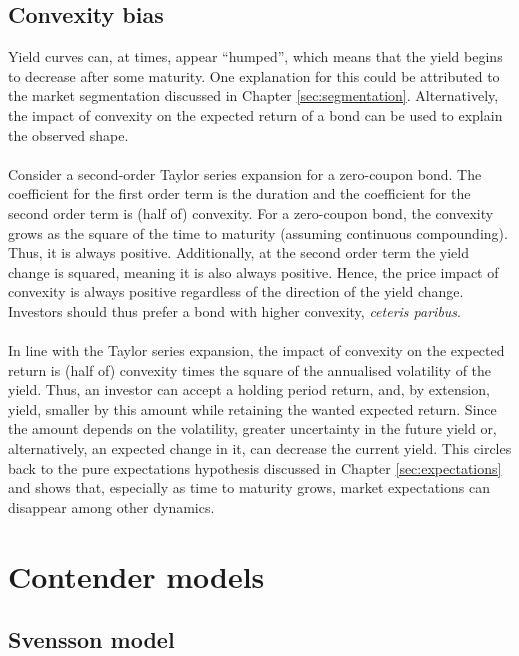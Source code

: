 \documentclass[a4paper]{artikel3}
\numberwithin{equation}{section}
\numberwithin{theorem}{section}
\numberwithin{proposition}{section}
\numberwithin{lemma}{section}
\begin{document}
\subsection{Convexity bias}
\label{sec:convexity}


Yield curves can, at times, appear ``humped'', which means that the yield begins to decrease after some maturity. One explanation for this could be attributed to the market segmentation discussed in Chapter \ref{sec:segmentation}. Alternatively, the impact of convexity on the expected return of a bond can be used to explain the observed shape. \\
\\
Consider a second-order Taylor series expansion for a zero-coupon bond. The coefficient for the first order term is the duration and the coefficient for the second order term is (half of) convexity. For a zero-coupon bond, the convexity grows as the square of the time to maturity (assuming continuous compounding). Thus, it is always positive. Additionally, at the second order term the yield change is squared, meaning it is also always positive. Hence, the price impact of convexity is always positive regardless of the direction of the yield change. Investors should thus prefer a bond with higher convexity, \emph{ceteris paribus}.\\
\\
In line with the Taylor series expansion, the impact of convexity on the expected return is (half of) convexity times the square of the annualised volatility of the yield. Thus, an investor can accept a holding period return, and, by extension, yield, smaller by this amount while retaining the wanted expected return. Since the amount depends on the volatility, greater uncertainty in the future yield or, alternatively, an expected change in it, can decrease the current yield. This circles back to the pure expectations hypothesis discussed in Chapter \ref{sec:expectations} and shows that, especially as time to maturity grows, market expectations can disappear among other dynamics. 


\clearpage


\section{Contender models}
\label{sec:contenders}


\subsection{Svensson model}
\label{sec:svensson}
\end{document}
